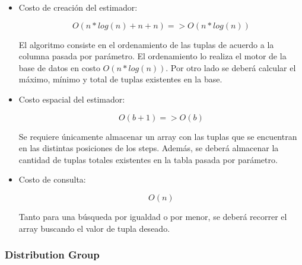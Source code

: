 \documentclass[10pt, a4paper,english,spanish,hidelinks]{article}
\begin{document}
\begin{itemize}

\item Costo de creación del estimador:

\begin{equation}
O(n*log(n) + n + n) => O(n*log(n))
\end{equation}

El algoritmo consiste en el ordenamiento de las tuplas de acuerdo a la columna pasada por
parámetro. El ordenamiento lo realiza el motor de la base de datos en costo $O(n*log(n))$.
Por otro lado se deberá calcular el máximo, mínimo y total de tuplas existentes en la base.

\item Costo espacial del estimador:

\begin{equation}
O(b + 1) => O(b)
\end{equation}

Se requiere únicamente almacenar un array con las tuplas que se encuentran en las distintas
posiciones de los steps. Además, se deberá almacenar la cantidad de tuplas totales
existentes en la tabla pasada por parámetro.

\item Costo de consulta:

\begin{equation}
O(n)
\end{equation}

Tanto para una búsqueda por igualdad o por menor, se deberá recorrer el array buscando
el valor de tupla deseado.

\end{itemize}



\subsubsection{Distribution Group}
\end{document}
